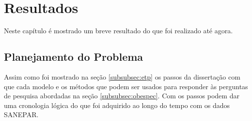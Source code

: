\section{Resultados} \label{sec:result}

Neste capítulo é mostrado um breve resultado do que foi realizado até agora.


\subsection{Planejamento do Problema} \label{subsec:planexp}

Assim como foi mostrado na seção \ref{subsubsec:etp} os passos da dissertação com que cada modelo e os métodos que podem ser usados para responder às perguntas de pesquisa abordadas na seção \ref{subsubsec:obespec}. Com os passos podem dar uma cronologia lógica do que foi adquirido ao longo do tempo com os dados SANEPAR.

















    
  
 
 

 
  
    

    
